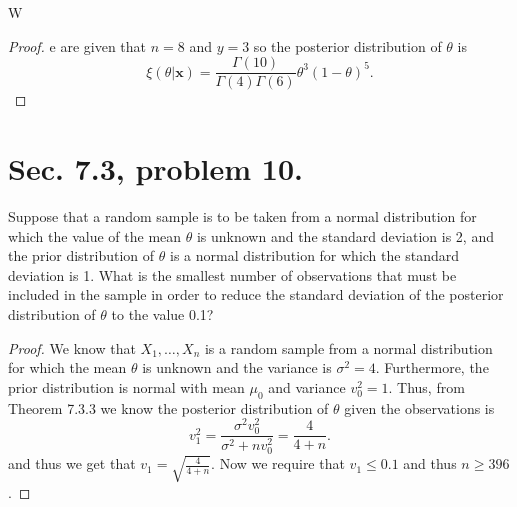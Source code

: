 \documentclass{article}
\newcommand{\randsamp}{X_1,\dots,X_n}
\newenvironment{hwproof}[1]
{
    #1
    \begin{proof}
}{
    \end{proof}
}
\begin{document}
\begin{hwproof}
    We are given that $n=8$ and $y = 3$ so the posterior distribution of $\theta$
    is
    \begin{equation*}
        \xi(\theta | \bm{x}) = \frac{\Gamma(10)}{\Gamma(4)\Gamma(6)}
        \theta^3(1-\theta)^{5}.
    \end{equation*}
\end{hwproof}

\section{Sec. 7.3, problem 10.}
\begin{hwproof}
    {
        Suppose that a random sample is to be taken from a normal distribution
        for which the value of the mean $\theta$ is unknown and the standard deviation
        is 2, and the prior distribution of $\theta$ is a normal distribution for
        which the standard deviation is 1. What is the smallest number of observations
        that must be included in the sample in order to reduce the standard deviation
        of the posterior distribution of $\theta$ to the value 0.1?
    }

    We know that $\randsamp$ is a random sample from a
    normal distribution for which the mean $\theta$ is unknown and the variance
    is $\sigma^2 = 4$. Furthermore, the prior distribution is normal with mean $\mu_0$ and
    variance $v_0^2 = 1$. Thus, from Theorem 7.3.3 we know the posterior
    distribution of $\theta$ given the observations is
    \begin{equation*}
        v_1^2 = \frac{\sigma^2v_0^2}{\sigma^2  + nv_0^2} = \frac{4}{4 + n}.
    \end{equation*}
    and thus we get that $v_1 = \sqrt{\frac{4}{4 + n}}$. Now we require that
    $v_1 \leq 0.1$ and thus $n \geq 396$.

\end{hwproof}
\end{document}
